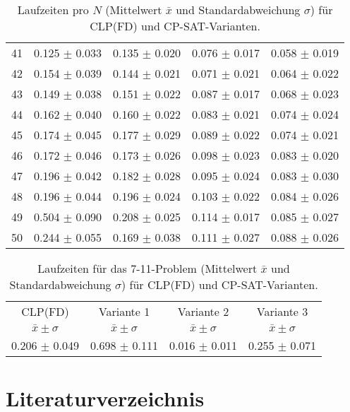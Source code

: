 \documentclass[12pt,a4paper]{article}
\begin{document}
\begin{table}[H]
\begin{tabular}{rcccc}
41 & 0.125 $\pm$ 0.033 & 0.135 $\pm$ 0.020 & 0.076 $\pm$ 0.017 & 0.058 $\pm$ 0.019 \\
42 & 0.154 $\pm$ 0.039 & 0.144 $\pm$ 0.021 & 0.071 $\pm$ 0.021 & 0.064 $\pm$ 0.022 \\
43 & 0.149 $\pm$ 0.038 & 0.151 $\pm$ 0.022 & 0.087 $\pm$ 0.017 & 0.068 $\pm$ 0.023 \\
44 & 0.162 $\pm$ 0.040 & 0.160 $\pm$ 0.022 & 0.083 $\pm$ 0.021 & 0.074 $\pm$ 0.024 \\
45 & 0.174 $\pm$ 0.045 & 0.177 $\pm$ 0.029 & 0.089 $\pm$ 0.022 & 0.074 $\pm$ 0.021 \\
46 & 0.172 $\pm$ 0.046 & 0.173 $\pm$ 0.026 & 0.098 $\pm$ 0.023 & 0.083 $\pm$ 0.020 \\
47 & 0.196 $\pm$ 0.042 & 0.182 $\pm$ 0.028 & 0.095 $\pm$ 0.024 & 0.083 $\pm$ 0.030 \\
48 & 0.196 $\pm$ 0.044 & 0.196 $\pm$ 0.024 & 0.103 $\pm$ 0.022 & 0.084 $\pm$ 0.026 \\
49 & 0.504 $\pm$ 0.090 & 0.208 $\pm$ 0.025 & 0.114 $\pm$ 0.017 & 0.085 $\pm$ 0.027 \\
50 & 0.244 $\pm$ 0.055 & 0.169 $\pm$ 0.038 & 0.111 $\pm$ 0.027 & 0.088 $\pm$ 0.026 \\
\bottomrule
\end{tabular}
\caption{Laufzeiten pro $N$ (Mittelwert $\bar{x}$ und Standardabweichung $\sigma$) für CLP(FD) und CP-SAT-Varianten.}
\label{tab:benchmark-nqueens}
\end{table}

\begin{table}[H]
\centering
\small
\setlength{\tabcolsep}{6pt}
\begin{tabular}{cccc}
\toprule
CLP(FD) & Variante 1 & Variante 2 & Variante 3 \\
$\bar{x} \pm \sigma$ & $\bar{x} \pm \sigma$ & $\bar{x} \pm \sigma$ & $\bar{x} \pm \sigma$ \\
\midrule
0.206 $\pm$ 0.049 & 0.698 $\pm$ 0.111 & 0.016 $\pm$ 0.011 & 0.255 $\pm$ 0.071 \\
\bottomrule
\end{tabular}
\caption{Laufzeiten für das 7-11-Problem (Mittelwert $\bar{x}$ und Standardabweichung $\sigma$) für CLP(FD) und CP-SAT-Varianten.}
\label{tab:benchmark-711}
\end{table}

\section{Literaturverzeichnis}
\renewcommand*{\bibname}{} %
\renewcommand*{\refname}{} %
\printbibliography
\end{document}
